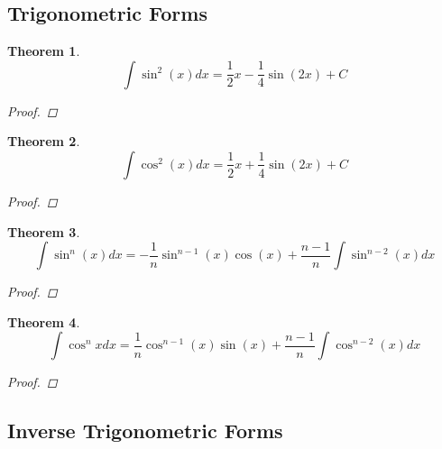 \documentclass[10pt]{report}
\newtheorem{thm3}{Theorem}[subsection]
\begin{document}
\subsection{Trigonometric Forms}
\begin{thm3}
$$\int \sin^2(x)dx=\frac{1}{2}x-\frac{1}{4}\sin(2x)+C$$
\begin{proof}

\end{proof}
\end{thm3}
\begin{thm3}
$$\int \cos^2(x)dx=\frac{1}{2}x+\frac{1}{4}\sin(2x) +C$$
\begin{proof}

\end{proof}
\end{thm3}
\begin{thm3}
$$\int \sin^n(x)dx=-\frac{1}{n}\sin^{n-1}(x) \cos (x)+\frac{n-1}{n}\int \sin^{n-2}(x)dx$$
\begin{proof}

\end{proof}
\end{thm3}
\begin{thm3}
$$\int \cos^nxdx=\frac{1}{n}\cos^{n-1}(x) \sin (x)+\frac{n-1}{n}\int \cos^{n-2}(x)dx$$
\begin{proof}

\end{proof}
\end{thm3}
\subsection{Inverse Trigonometric Forms}
\end{document}
